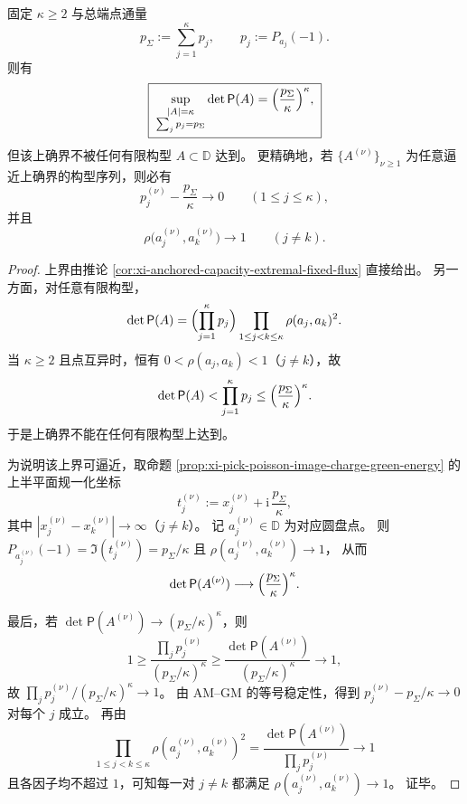 \begin{theorem}[固定总端点通量下行列式前沿的非达成性]\label{thm:xi-anchored-fixed-flux-frontier-nonattainment}
固定 \(\kappa\ge 2\) 与总端点通量
\[
p_{\Sigma}:=\sum_{j=1}^{\kappa}p_j,
\qquad
p_j:=P_{a_j}(-1).
\]
则有
\[
\boxed{\;
\sup_{\substack{|A|=\kappa\\ \sum_j p_j=p_{\Sigma}}}\det\mathsf P(A)
=
\Bigl(\frac{p_{\Sigma}}{\kappa}\Bigr)^\kappa,\;}
\]
但该上确界不被任何有限构型 \(A\subset\mathbb D\) 达到。
更精确地，若 \(\{A^{(\nu)}\}_{\nu\ge 1}\) 为任意逼近上确界的构型序列，则必有
\[
p_j^{(\nu)}-\frac{p_{\Sigma}}{\kappa}\longrightarrow 0
\qquad(1\le j\le \kappa),
\]
并且
\[
\rho\bigl(a_j^{(\nu)},a_k^{(\nu)}\bigr)\longrightarrow 1
\qquad(j\neq k).
\]
\end{theorem}
\begin{proof}
上界由推论 \ref{cor:xi-anchored-capacity-extremal-fixed-flux} 直接给出。
另一方面，对任意有限构型，
\[
\det\mathsf P(A)
=
\Bigl(\prod_{j=1}^{\kappa}p_j\Bigr)\prod_{1\le j<k\le \kappa}\rho(a_j,a_k)^2.
\]
当 \(\kappa\ge 2\) 且点互异时，恒有 \(0<\rho(a_j,a_k)<1\)（\(j\neq k\)），故
\[
\det\mathsf P(A)
<
\prod_{j=1}^{\kappa}p_j
\le
\Bigl(\frac{p_{\Sigma}}{\kappa}\Bigr)^\kappa.
\]
于是上确界不能在任何有限构型上达到。

为说明该上界可逼近，取命题 \ref{prop:xi-pick-poisson-image-charge-green-energy} 的上半平面规一化坐标
\[
t_j^{(\nu)}:=x_j^{(\nu)}+\mathrm{i}\,\frac{p_{\Sigma}}{\kappa},
\]
其中 \(|x_j^{(\nu)}-x_k^{(\nu)}|\to\infty\)（\(j\neq k\)）。
记 \(a_j^{(\nu)}\in\mathbb D\) 为对应圆盘点。
则
\(
P_{a_j^{(\nu)}}(-1)=\Im(t_j^{(\nu)})=p_{\Sigma}/\kappa
\)
且
\(
\rho(a_j^{(\nu)},a_k^{(\nu)})\to 1
\)，
从而
\[
\det\mathsf P(A^{(\nu)})
\longrightarrow
\Bigl(\frac{p_{\Sigma}}{\kappa}\Bigr)^\kappa.
\]

最后，若 \(\det\mathsf P(A^{(\nu)})\to (p_{\Sigma}/\kappa)^\kappa\)，则
\[
1\ge
\frac{\prod_j p_j^{(\nu)}}{(p_{\Sigma}/\kappa)^\kappa}
\ge
\frac{\det\mathsf P(A^{(\nu)})}{(p_{\Sigma}/\kappa)^\kappa}
\longrightarrow 1,
\]
故
\(
\prod_j p_j^{(\nu)}/(p_{\Sigma}/\kappa)^\kappa\to 1
\)。
由 AM--GM 的等号稳定性，得到
\(
p_j^{(\nu)}-p_{\Sigma}/\kappa\to 0
\)
对每个 \(j\) 成立。
再由
\[
\prod_{1\le j<k\le \kappa}\rho(a_j^{(\nu)},a_k^{(\nu)})^2
=
\frac{\det\mathsf P(A^{(\nu)})}{\prod_j p_j^{(\nu)}}
\longrightarrow 1
\]
且各因子均不超过 \(1\)，可知每一对 \(j\neq k\) 都满足
\(
\rho(a_j^{(\nu)},a_k^{(\nu)})\to 1
\)。
证毕。
\end{proof}

